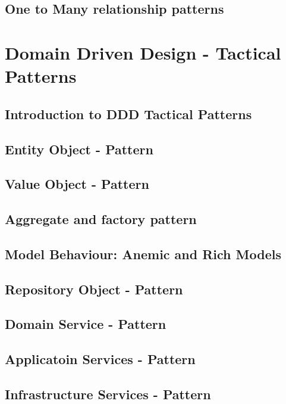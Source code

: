 \documentclass[a4paper, 11pt]{book}
\begin{document}
    \section{One to Many relationship patterns}


    \chapter{Domain Driven Design - Tactical Patterns}


    \section{Introduction to DDD Tactical Patterns}


    \section{Entity Object - Pattern}


    \section{Value Object - Pattern}


    \section{Aggregate and factory pattern}


    \section{Model Behaviour: Anemic and Rich Models}


    \section{Repository Object - Pattern}


    \section{Domain Service - Pattern}


    \section{Applicatoin Services - Pattern}


    \section{Infrastructure Services - Pattern}
\end{document}
